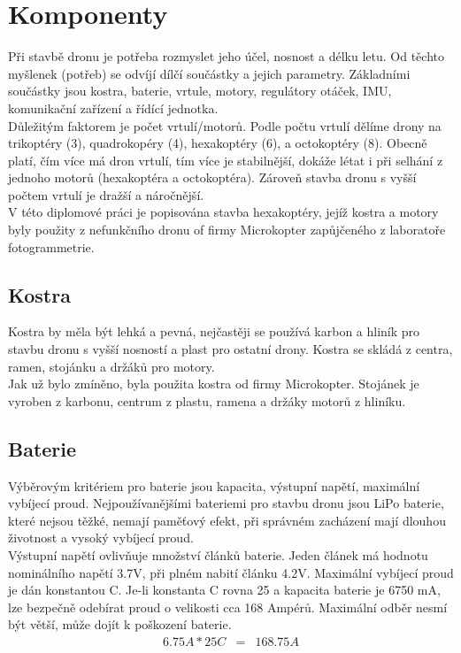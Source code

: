 \chapter{Komponenty}
\label{3-soucastky}

Při stavbě dronu je potřeba rozmyslet jeho účel, nosnost a délku letu. Od těchto myšlenek (potřeb) se odvíjí dílčí součástky a jejich parametry. Základními součástky jsou kostra, baterie, vrtule, motory, regulátory otáček, IMU, komunikační zařízení a řídící jednotka.\\
Důležitým faktorem je počet vrtulí/motorů. Podle počtu vrtulí dělíme drony na trikoptéry (3), quadrokopéry (4), hexakoptéry (6), a octokoptéry (8). Obecně platí, čím více má dron vrtulí, tím více je stabilnější, dokáže létat i při selhání z jednoho motorů (hexakoptéra a octokoptéra). Zároveň stavba dronu s vyšší počtem vrtulí je dražší a náročnější.\\
V této diplomové práci je popisována stavba hexakoptéry, jejíž kostra a motory byly použity z nefunkčního dronu of firmy Microkopter zapůjčeného z laboratoře fotogrammetrie.\\

\section{Kostra} 
Kostra by měla být lehká a pevná, nejčastěji se používá karbon a hliník pro stavbu dronu s vyšší nosností a plast pro ostatní drony. Kostra se skládá z centra, ramen, stojánku a držáků pro motory.\\
Jak už bylo zmíněno, byla použita kostra od firmy Microkopter. Stojánek je vyroben z karbonu, centrum z plastu, ramena a držáky motorů z hliníku.\\


\section{Baterie} 
Výběrovým kritériem pro baterie jsou kapacita, výstupní napětí, maximální vybíjecí proud.
Nejpoužívanějšími bateriemi pro stavbu dronu jsou LiPo baterie, které nejsou těžké, nemají paměťový efekt, při správném zacházení mají dlouhou životnost a vysoký vybíjecí proud.\\
Výstupní napětí ovlivňuje množství článků baterie. Jeden článek má hodnotu nominálního napětí 3.7V, při plném nabití článku 4.2V. Maximální vybíjecí proud je dán konstantou C. Je-li konstanta C rovna 25 a kapacita baterie je 6750 mA, lze bezpečně odebírat proud o velikosti cca 168 Ampérů. Maximální odběr nesmí být větší, může dojít k poškození baterie.\\
\begin{eqnarray*} 
	6.75A * 25C & = & 168.75A\\
\end{eqnarray*} 

